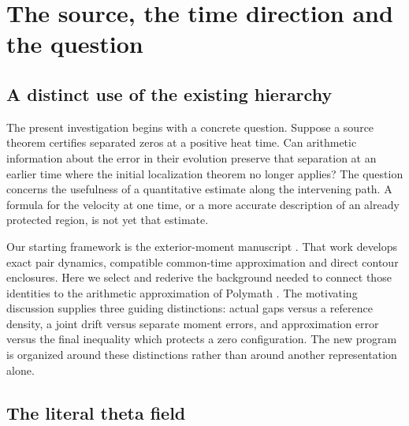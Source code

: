 \section{The source, the time direction and the question}
\label{sec:source}

\subsection{A distinct use of the existing hierarchy}

The present investigation begins with a concrete question. Suppose a
source theorem certifies separated zeros at a positive heat time. Can
arithmetic information about the error in their evolution preserve that
separation at an earlier time where the initial localization theorem
no longer applies? The question concerns the usefulness of a quantitative
estimate along the intervening path. A formula for the velocity at one
time, or a more accurate description of an already protected region,
is not yet that estimate.

Our starting framework is the exterior-moment manuscript
\cite{VCDCMManuscript}. That work develops exact pair dynamics,
compatible common-time approximation and direct contour enclosures.
Here we select and rederive the background needed to connect those
identities to the arithmetic approximation of Polymath
\cite{Polymath2019}. The motivating discussion
\cite{VCDCMDiscussion08,VCDCMDiscussion09,VCDCMDiscussion10,
VCDCMDiscussion11,VCDCMDiscussion12} supplies three guiding distinctions:
actual gaps versus a reference density, a joint drift versus separate
moment errors, and approximation error versus the final inequality
which protects a zero configuration. The new program is organized around
these distinctions rather than around another representation alone.

\subsection{The literal theta field}

